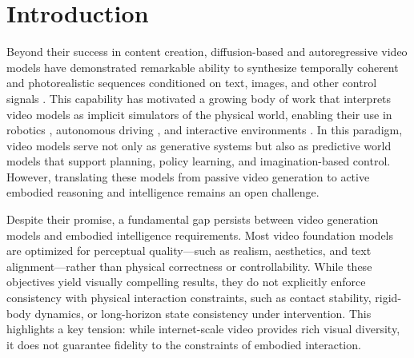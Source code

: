 \section{Introduction} \label{sec:intro}

Beyond their success in content creation, diffusion-based \cite{ho2022video,ho2022imagen,singer2022make,bar2024lumiere,blattmann2023stable,wan2025wan,seedance2026seedance} and autoregressive \cite{yan2021videogpt,villegas2022phenaki,gupta2024photorealistic} video models have demonstrated remarkable ability to synthesize temporally coherent and photorealistic sequences conditioned on text, images, and other control signals \cite{esser2023structure,guo2023animatediff,bruce2024genie,team2026advancing,sun2025worldplay}. This capability has motivated a growing body of work that interprets video models as implicit simulators of the physical world, enabling their use in robotics \cite{agarwal2026cosmos,liao2025genie,li2026causal}, autonomous driving \cite{russell2025gaia,ren2025cosmos}, and interactive environments \cite{bruce2024genie}. In this paradigm, video models serve not only as generative systems but also as predictive world models \cite{assran2025v} that support planning, policy learning, and imagination-based control. However, translating these models from passive video generation to active embodied reasoning and intelligence remains an open challenge.

Despite their promise, a fundamental gap persists between video generation models and embodied intelligence requirements. Most video foundation models are optimized for perceptual quality—such as realism, aesthetics, and text alignment—rather than physical correctness or controllability. While these objectives yield visually compelling results, they do not explicitly enforce consistency with physical interaction constraints, such as contact stability, rigid-body dynamics, or long-horizon state consistency under intervention. This highlights a key tension: while internet-scale video provides rich visual diversity, it does not guarantee fidelity to the constraints of embodied interaction.

